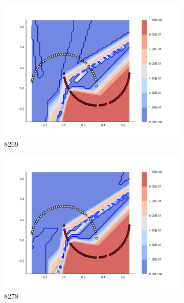 \begin{figure}[h]
\begin{subfigure}[b]{0.09\textwidth}
    \includegraphics[clip, trim=2.35cm 1.75cm 4.5cm 0cm,width=\textwidth]{img/convergence/8269.pdf}
    \caption{8269}
    \label{fig:convergence_8269}
\end{subfigure}
%
\begin{subfigure}[b]{0.09\textwidth}
    \includegraphics[clip, trim=2.35cm 1.75cm 4.5cm 0cm,width=\textwidth]{img/convergence/8278.pdf}
    \caption{8278}
    \label{fig:convergence_8278}
\end{subfigure}
%
\begin{subfigure}[b]{0.09\textwidth}

\end{subfigure}
\end{figure}
